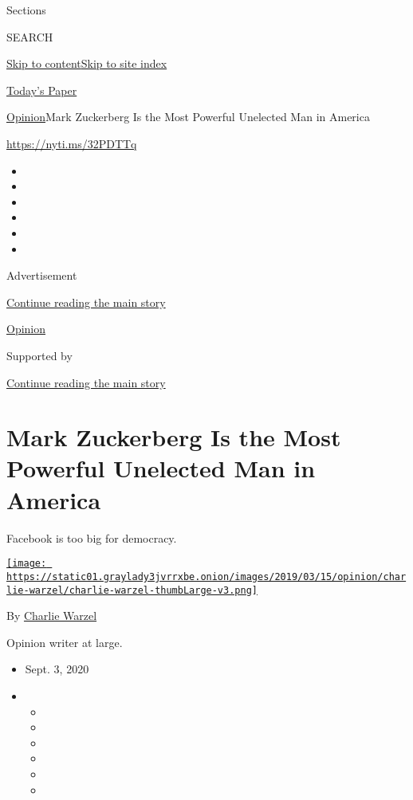 Sections

SEARCH

\protect\hyperlink{site-content}{Skip to
content}\protect\hyperlink{site-index}{Skip to site index}

\href{https://myaccount.nytimes3xbfgragh.onion/auth/login?response_type=cookie\&client_id=vi}{}

\href{https://www.nytimes3xbfgragh.onion/section/todayspaper}{Today's
Paper}

\href{/section/opinion}{Opinion}\textbar{}Mark Zuckerberg Is the Most
Powerful Unelected Man in America

\url{https://nyti.ms/32PDTTq}

\begin{itemize}
\item
\item
\item
\item
\item
\item
\end{itemize}

Advertisement

\protect\hyperlink{after-top}{Continue reading the main story}

\href{/section/opinion}{Opinion}

Supported by

\protect\hyperlink{after-sponsor}{Continue reading the main story}

\hypertarget{mark-zuckerberg-is-the-most-powerful-unelected-man-in-america}{%
\section{Mark Zuckerberg Is the Most Powerful Unelected Man in
America}\label{mark-zuckerberg-is-the-most-powerful-unelected-man-in-america}}

Facebook is too big for democracy.

\href{https://www.nytimes3xbfgragh.onion/by/charlie-warzel}{\texttt{[image: https://static01.graylady3jvrrxbe.onion/images/2019/03/15/opinion/charlie-warzel/charlie-warzel-thumbLarge-v3.png]}}

By \href{https://www.nytimes3xbfgragh.onion/by/charlie-warzel}{Charlie
Warzel}

Opinion writer at large.

\begin{itemize}
\item
  Sept. 3, 2020
\item
  \begin{itemize}
  \item
  \item
  \item
  \item
  \item
  \item
  \end{itemize}
\end{itemize}

